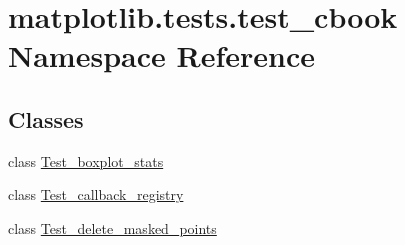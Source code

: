 \hypertarget{namespacematplotlib_1_1tests_1_1test__cbook}{}\section{matplotlib.\+tests.\+test\+\_\+cbook Namespace Reference}
\label{namespacematplotlib_1_1tests_1_1test__cbook}
\subsection*{Classes}
\begin{DoxyCompactItemize}
\item 
class \hyperlink{classmatplotlib_1_1tests_1_1test__cbook_1_1Test__boxplot__stats}{Test\+\_\+boxplot\+\_\+stats}
\item 
class \hyperlink{classmatplotlib_1_1tests_1_1test__cbook_1_1Test__callback__registry}{Test\+\_\+callback\+\_\+registry}
\item 
class \hyperlink{classmatplotlib_1_1tests_1_1test__cbook_1_1Test__delete__masked__points}{Test\+\_\+delete\+\_\+masked\+\_\+points}
\end{DoxyCompactItemize}
